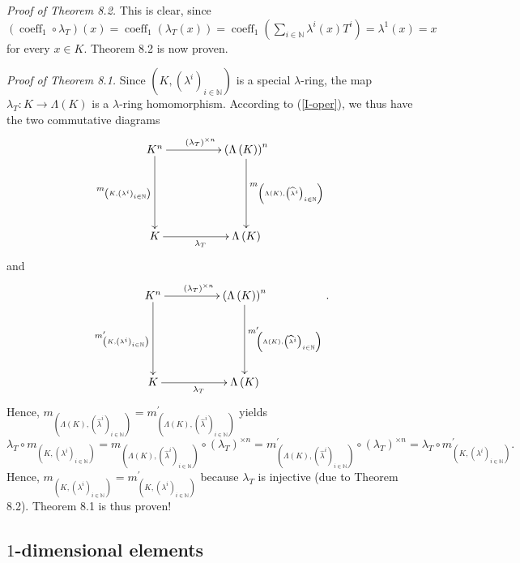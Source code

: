 \documentclass[numbers=enddot,12pt,final,onecolumn,notitlepage]{scrartcl}%
\begin{document}
\textit{Proof of Theorem 8.2.} This is clear, since $\left(
\operatorname*{coeff}\nolimits_{1}\circ\lambda_{T}\right)  \left(  x\right)
=\operatorname*{coeff}\nolimits_{1}\left(  \lambda_{T}\left(  x\right)
\right)  =\operatorname*{coeff}\nolimits_{1}\left(  \sum\limits_{i\in
\mathbb{N}}\lambda^{i}\left(  x\right)  T^{i}\right)  =\lambda^{1}\left(
x\right)  =x$ for every $x\in K$. Theorem 8.2 is now proven.

\textit{Proof of Theorem 8.1.} Since $\left(  K,\left(  \lambda^{i}\right)
_{i\in\mathbb{N}}\right)  $ is a special $\lambda$-ring, the map $\lambda
_{T}:K\rightarrow\Lambda\left(  K\right)  $ is a $\lambda$-ring homomorphism.
According to (\ref{I-oper}), we thus have the two commutative diagrams%
\[
\xymatrixrowsep{5pc}\xymatrixcolsep{4pc}\xymatrix{
K^n \ar[r]^{\left(\lambda_T\right)^{\times n}} \ar[d]_{m_{\left(K,\left(\lambda^i\right)_{i\in\mathbb{N}}\right)}} & \left(\Lambda\left(K\right)\right)^n \ar[d]^{m_{\left(\Lambda\left(K\right),\left(\widehat{\lambda}^i\right)_{i\in\mathbb{N}}\right)}} \\
K \ar[r]_{\lambda_T} & \Lambda\left(K\right)
}
\]
and%
\[
\xymatrixrowsep{5pc}\xymatrixcolsep{4pc}\xymatrix{
K^n \ar[r]^{\left(\lambda_T\right)^{\times n}} \ar[d]_{m^{\prime}_{\left(K,\left(\lambda^i\right)_{i\in\mathbb{N}}\right)}} & \left(\Lambda\left(K\right)\right)^n \ar[d]^{m^{\prime}_{\left(\Lambda\left(K\right),\left(\widehat{\lambda}^i\right)_{i\in\mathbb{N}}\right)}} \\
K \ar[r]_{\lambda_T} & \Lambda\left(K\right)
}.
\]
Hence, $m_{\left(  \Lambda\left(  K\right)  ,\left(  \widehat{\lambda}%
^{i}\right)  _{i\in\mathbb{N}}\right)  }=m_{\left(  \Lambda\left(  K\right)
,\left(  \widehat{\lambda}^{i}\right)  _{i\in\mathbb{N}}\right)  }^{\prime}$
yields%
\[
\lambda_{T}\circ m_{\left(  K,\left(  \lambda^{i}\right)  _{i\in\mathbb{N}%
}\right)  }=m_{\left(  \Lambda\left(  K\right)  ,\left(  \widehat{\lambda}%
^{i}\right)  _{i\in\mathbb{N}}\right)  }\circ\left(  \lambda_{T}\right)
^{\times n}=m_{\left(  \Lambda\left(  K\right)  ,\left(  \widehat{\lambda}%
^{i}\right)  _{i\in\mathbb{N}}\right)  }^{\prime}\circ\left(  \lambda
_{T}\right)  ^{\times n}=\lambda_{T}\circ m_{\left(  K,\left(  \lambda
^{i}\right)  _{i\in\mathbb{N}}\right)  }^{\prime}.
\]
Hence, $m_{\left(  K,\left(  \lambda^{i}\right)  _{i\in\mathbb{N}}\right)
}=m_{\left(  K,\left(  \lambda^{i}\right)  _{i\in\mathbb{N}}\right)  }%
^{\prime}$ because $\lambda_{T}$ is injective (due to Theorem 8.2). Theorem
8.1 is thus proven!

\subsection{$1$-dimensional elements}
\end{document}
